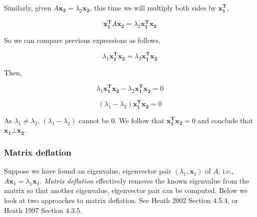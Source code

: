 \documentclass{article}
\renewcommand{\vec}[1]{\mathbf{#1}}
\begin{document}
\begin{enumerate}
Similarly, given $A\vec{x_2}=\lambda_2\vec{x_2}$, this time we will multiply both sides by $\vec{x^T_1}$, 

$$\vec{x^T_1}A\vec{x_2}=\lambda_2\vec{x^T_1}\vec{x_2}$$

So we can compare previous expressions as follows,

$$\lambda_1\vec{x^T_1}\vec{x_2}=\lambda_2\vec{x^T_1}\vec{x_2}$$

Then,

$$\lambda_1\vec{x^T_1}\vec{x_2}-\lambda_2\vec{x^T_1}\vec{x_2}=0$$

$$(\lambda_1-\lambda_2)\vec{x^T_1}\vec{x_2}=0$$

As $\lambda_1\neq\lambda_2$, $(\lambda_1-\lambda_2)$ cannot be $0$. We follow that $\vec{x^T_1}\vec{x_2}=0$ and conclude that $\vec{x_1}\bot\vec{x_2}$.

\end{enumerate}

\subsubsection*{Matrix deflation}

Suppose we have found an eigenvalue, eigenvector pair $(\lambda_1,\vec{x}_1)$ of $A$, i.e., $A \vec{x}_1 = \lambda_1 \vec{x}_1$.  \emph{Matrix deflation} effectively removes the known
eigenvalue from the matrix so that another eigenvalue, eigenvector pair can be computed.  Below we look at two approaches to matrix deflation.  See Heath 2002 Section 4.5.4, or Heath 1997 Section 4.3.5.
\end{document}
